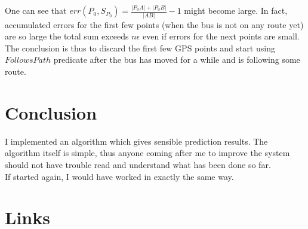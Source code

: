\documentclass[12pt,a4paper,oneside,openright]{report}
\begin{document}
One can see that $err(P_0, S_{P_0}) = \frac{|{P_0}A| + |{P_0}B|}{|AB|} - 1$
might become large. In fact, accumulated errors for the first few points (when the bus is not on any route yet) are so large the total sum exceeds $n\epsilon$ even if errors for the next points are small. \\

The conclusion is thus to discard the first few GPS points and start using
$FollowsPath$ predicate after the bus has moved for a while and is following 
some route.

\chapter{Conclusion}

I implemented an algorithm which gives sensible prediction results. The
algorithm itself is simple, thus anyone coming after me to improve the
system should not have trouble read and understand what has been done so far. \\

If started again, I would have worked in exactly the same way.




\appendix

\chapter{Links}
\end{document}

